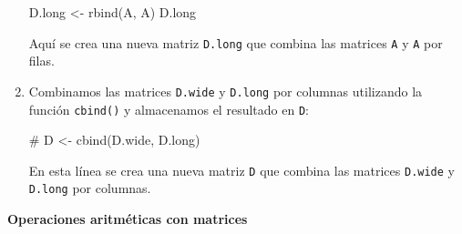 \documentclass[
  letterpaper,
  DIV=11,
  numbers=noendperiod]{scrartcl}
\newenvironment{Shaded}{}{}
\newcommand{\CommentTok}[1]{\textcolor[rgb]{0.42,0.45,0.49}{#1}}
\newcommand{\FunctionTok}[1]{\textcolor[rgb]{0.44,0.26,0.76}{#1}}
\newcommand{\NormalTok}[1]{\textcolor[rgb]{0.14,0.16,0.18}{#1}}
\newcommand{\OtherTok}[1]{\textcolor[rgb]{0.44,0.26,0.76}{#1}}
\begin{document}
\begin{enumerate}
\begin{Shaded}
\begin{Highlighting}[]
\NormalTok{D.long }\OtherTok{\textless{}{-}} \FunctionTok{rbind}\NormalTok{(A, A)}
\NormalTok{D.long}
\end{Highlighting}
\end{Shaded}

  Aquí se crea una nueva matriz \texttt{D.long} que combina las matrices
  \texttt{A} y \texttt{A} por filas.
\item
  Combinamos las matrices \texttt{D.wide} y \texttt{D.long} por columnas
  utilizando la función \texttt{cbind()} y almacenamos el resultado en
  \texttt{D}:

\begin{Shaded}
\begin{Highlighting}[]
\CommentTok{\# D \textless{}{-} cbind(D.wide, D.long)}
\end{Highlighting}
\end{Shaded}

  En esta línea se crea una nueva matriz \texttt{D} que combina las
  matrices \texttt{D.wide} y \texttt{D.long} por columnas.
\end{enumerate}

\textbf{Operaciones aritméticas con matrices}
\end{document}

